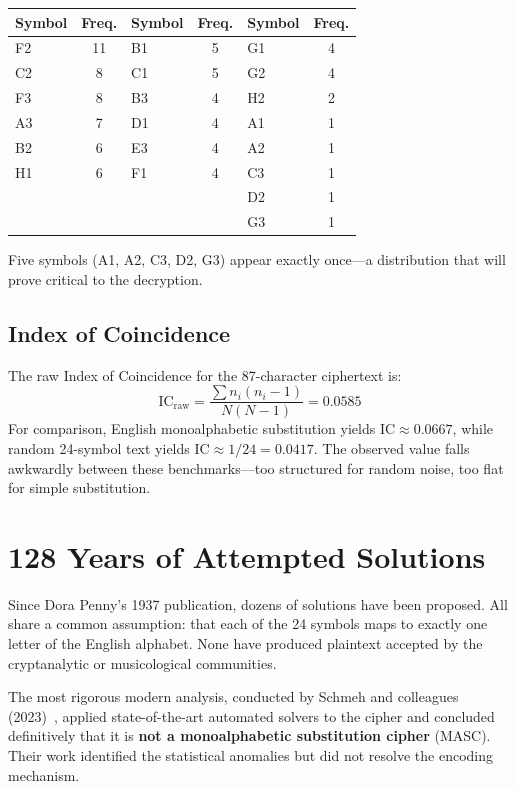 \documentclass[12pt,a4paper]{article}
\begin{document}
\begin{center}
\begin{tabular}{lclclc}
\toprule
Symbol & Freq. & Symbol & Freq. & Symbol & Freq.\\
\midrule
F2 & 11 & B1 & 5 & G1 & 4\\
C2 & 8 & C1 & 5 & G2 & 4\\
F3 & 8 & B3 & 4 & H2 & 2\\
A3 & 7 & D1 & 4 & A1 & 1\\
B2 & 6 & E3 & 4 & A2 & 1\\
H1 & 6 & F1 & 4 & C3 & 1\\
   &    &    &    & D2 & 1\\
   &    &    &    & G3 & 1\\
\bottomrule
\end{tabular}
\end{center}

Five symbols (A1, A2, C3, D2, G3) appear exactly once---a distribution that will prove critical to the decryption.

\subsection{Index of Coincidence}

The raw Index of Coincidence for the 87-character ciphertext is:
\[
\text{IC}_{\text{raw}} = \frac{\sum n_i(n_i - 1)}{N(N-1)} = 0.0585
\]
For comparison, English monoalphabetic substitution yields $\text{IC} \approx 0.0667$, while random 24-symbol text yields $\text{IC} \approx 1/24 = 0.0417$. The observed value falls awkwardly between these benchmarks---too structured for random noise, too flat for simple substitution.

\section{128 Years of Attempted Solutions}

Since Dora Penny's 1937 publication, dozens of solutions have been proposed. All share a common assumption: that each of the 24 symbols maps to exactly one letter of the English alphabet. None have produced plaintext accepted by the cryptanalytic or musicological communities.

The most rigorous modern analysis, conducted by Schmeh and colleagues (2023)~\cite{schmeh2023}, applied state-of-the-art automated solvers to the cipher and concluded definitively that it is \textbf{not a monoalphabetic substitution cipher} (MASC). Their work identified the statistical anomalies but did not resolve the encoding mechanism.
\end{document}
